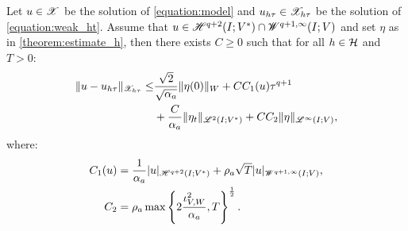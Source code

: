 \begin{theorem} \label{theorem:estimate_ht}
    Let $u \in \mathscr{X}$ be the solution of \eqref{equation:model} and $u_{h \tau} \in \mathscr{X}_{h \tau}$ be the solution of \eqref{equation:weak_ht}. Assume that $u \in \mathscr{H}^{q + 2}(I; V^*) \cap \mathscr{W}^{q + 1, \infty}(I; V)$ and set $\eta$ as in \autoref{theorem:estimate_h}, then there exists $C \geq 0$ such that for all $h \in \mathcal{H}$ and $T > 0$:
    \begin{align}
        \lVert u - u_{h \tau} \rVert_{\mathscr{X}_{h \tau}} \leq & \frac{\sqrt{2}}{\sqrt{\alpha_{a}}} \lVert \eta(0) \rVert_W + C C_1(u) \tau^{q + 1} \\
        & + \frac{C}{\alpha_{a}} \lVert \eta_t \rVert_{\mathscr{L}^{2}(I; V^*)} + C C_2 \lVert \eta \rVert_{\mathscr{L}^{\infty}(I; V)}, \notag
    \end{align}
    where:
    \begin{align}
        C_1(u) & = \frac{1}{\alpha_{a}} \lvert u \rvert_{\mathscr{H}^{q + 2}(I; V^*)} + \rho_{a} \sqrt{T} \lvert u \rvert_{\mathscr{W}^{q + 1, \infty}(I; V)}, \\
        C_2 & = \rho_{a} \max \left\{ 2 \frac{\iota_{V, W}^2}{\alpha_{a}}, T \right\}^{\frac{1}{2}}.
    \end{align}
\end{theorem}